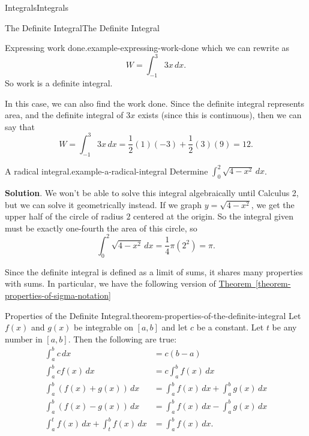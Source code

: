 \documentclass[10pt,]{book}
\numberwithin{equation}{section}
\begin{document}
\begin{chapterptx}{Integrals}{}{Integrals}{}{}
\begin{sectionptx}{The Definite Integral}{}{The Definite Integral}{}{}
\begin{example}{Expressing work done.}{example-expressing-work-done}
which we can rewrite as%
\begin{equation*}
W = \int_{-1}^{3}3x\,dx.
\end{equation*}
So work is a definite integral.%
\par
\hypertarget{p-432}{}%
In this case, we can also find the work done. Since the definite integral represents area, and the definite integral of \(3x\) exists (since this is continuous), then we can say that%
\begin{equation*}
W = \int_{-1}^{3}3x\,dx = \frac{1}{2}(1)(-3) + \frac{1}{2}(3)(9) = 12.
\end{equation*}
%
\end{example}
\begin{example}{A radical integral.}{example-a-radical-integral}%
\hypertarget{p-433}{}%
Determine \(\int_{0}^{2}\sqrt{4-x^{2}}\,dx\).%
\par\smallskip%
\noindent\textbf{Solution}.\hypertarget{solution-95}{}\quad%
\hypertarget{p-434}{}%
We won't be able to solve this integral algebraically until Calculus 2, but we can solve it geometrically instead. If we graph \(y = \sqrt{4-x^{2}}\), we get the upper half of the circle of radius \(2\) centered at the origin. So the integral given must be exactly one-fourth the area of this circle, so%
\begin{equation*}
\int_{0}^{2}\sqrt{4-x^{2}}\,dx = \frac{1}{4}\pi(2^{2}) = \pi.
\end{equation*}
%
\end{example}
\hypertarget{p-435}{}%
Since the definite integral is defined as a limit of sums, it shares many properties with sums. In particular, we have the following version of \hyperref[theorem-properties-of-sigma-notation]{Theorem~\ref{theorem-properties-of-sigma-notation}}%
\begin{theorem}{Properties of the Definite Integral.}{}{theorem-properties-of-the-definite-integral}%
\hypertarget{p-436}{}%
Let \(f(x)\) and \(g(x)\) be integrable on \([a,b]\) and let \(c\) be a constant. Let \(t\) be any number in \([a,b]\). Then the following are true:%
\begin{align*}
\int_{a}^{b}c\,dx & = c(b-a) \\
\int_{a}^{b}cf(x)\,dx & = c\int_{a}^{b}f(x)\,dx \\
\int_{a}^{b}(f(x)+g(x))\,dx & = \int_{a}^{b}f(x)\,dx + \int_{a}^{b}g(x)\,dx\\
\int_{a}^{b}(f(x) - g(x))\,dx & = \int_{a}^{b}f(x)\,dx - \int_{a}^{b}g(x)\,dx \\
\int_{a}^{t}f(x)\,dx + \int_{t}^{b}f(x)\,dx & = \int_{a}^{b}f(x)\,dx. 

\end{align*}
\end{theorem}
\end{sectionptx}
\end{chapterptx}
\end{document}
